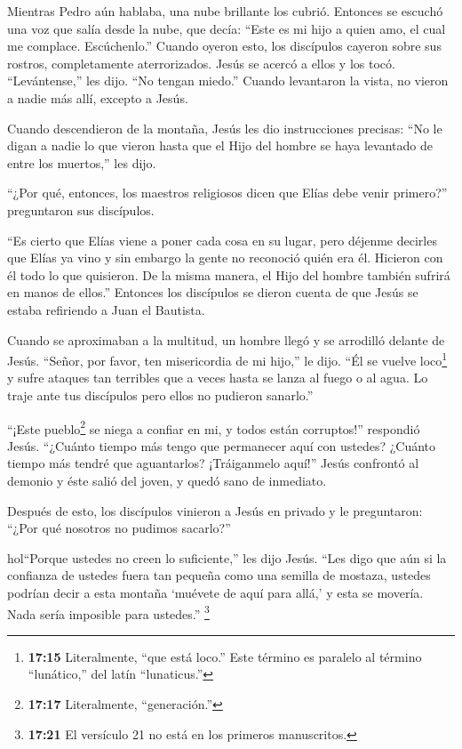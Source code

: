  Mientras Pedro aún hablaba, una nube brillante los cubrió.
Entonces se escuchó una voz que salía desde la nube, que decía: ``Este
es mi hijo a quien amo, el cual me complace. Escúchenlo.'' 
Cuando oyeron esto, los discípulos cayeron sobre sus rostros,
completamente aterrorizados.  Jesús se acercó a ellos y los
tocó. ``Levántense,'' les dijo. ``No tengan miedo.''  Cuando
levantaron la vista, no vieron a nadie más allí, excepto a Jesús.

 Cuando descendieron de la montaña, Jesús les dio
instrucciones precisas: ``No le digan a nadie lo que vieron hasta que el
Hijo del hombre se haya levantado de entre los muertos,'' les dijo.

 ``¿Por qué, entonces, los maestros religiosos dicen que
Elías debe venir primero?'' preguntaron sus discípulos.

 ``Es cierto que Elías viene a poner cada cosa en su lugar,
 pero déjenme decirles que Elías ya vino y sin embargo la
gente no reconoció quién era él. Hicieron con él todo lo que quisieron.
De la misma manera, el Hijo del hombre también sufrirá en manos de
ellos.''  Entonces los discípulos se dieron cuenta de que
Jesús se estaba refiriendo a Juan el Bautista.

 Cuando se aproximaban a la multitud, un hombre llegó y se
arrodilló delante de Jesús.  ``Señor, por favor, ten
misericordia de mi hijo,'' le dijo. ``Él se vuelve loco\footnote{\textbf{17:15}
  Literalmente, ``que está loco.'' Este término es paralelo al término
  ``lunático,'' del latín ``lunaticus.''} y sufre ataques tan terribles
que a veces hasta se lanza al fuego o al agua.  Lo traje
ante tus discípulos pero ellos no pudieron sanarlo.''

 ``¡Este pueblo\footnote{\textbf{17:17} Literalmente,
  ``generación.''} se niega a confiar en mi, y todos están corruptos!''
respondió Jesús. ``¿Cuánto tiempo más tengo que permanecer aquí con
ustedes? ¿Cuánto tiempo más tendré que aguantarlos? ¡Tráiganmelo aquí!''
 Jesús confrontó al demonio y éste salió del joven, y quedó
sano de inmediato.

 Después de esto, los discípulos vinieron a Jesús en
privado y le preguntaron: ``¿Por qué nosotros no pudimos sacarlo?''

 hol``Porque ustedes no creen lo suficiente,'' les dijo
Jesús. ``Les digo que aún si la confianza de ustedes fuera tan pequeña
como una semilla de mostaza, ustedes podrían decir a esta montaña
`muévete de aquí para allá,' y esta se movería. Nada sería imposible
para ustedes.''  \footnote{\textbf{17:21} El versículo 21
  no está en los primeros manuscritos.}

